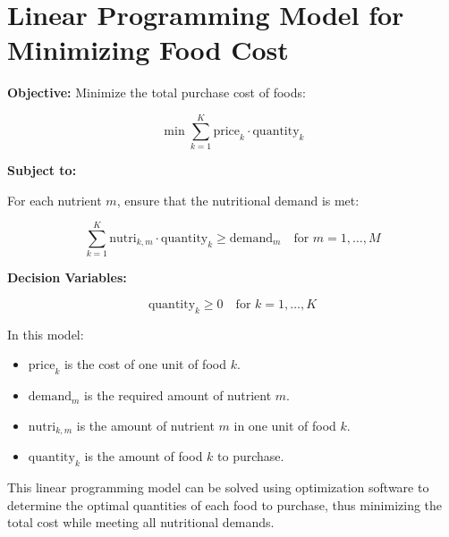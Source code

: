 \documentclass{article}
\begin{document}
\section*{Linear Programming Model for Minimizing Food Cost}

\textbf{Objective:}
Minimize the total purchase cost of foods:

\[
\min \sum_{k=1}^{K} \text{price}_k \cdot \text{quantity}_k
\]

\textbf{Subject to:}

For each nutrient \( m \), ensure that the nutritional demand is met:

\[
\sum_{k=1}^{K} \text{nutri}_{k, m} \cdot \text{quantity}_k \geq \text{demand}_m \quad \text{for } m = 1, \ldots, M
\]

\textbf{Decision Variables:}

\[
\text{quantity}_k \geq 0 \quad \text{for } k = 1, \ldots, K
\]

In this model:
\begin{itemize}
    \item \(\text{price}_k\) is the cost of one unit of food \( k \).
    \item \(\text{demand}_m\) is the required amount of nutrient \( m \).
    \item \(\text{nutri}_{k, m}\) is the amount of nutrient \( m \) in one unit of food \( k \).
    \item \(\text{quantity}_k\) is the amount of food \( k \) to purchase.
\end{itemize}

This linear programming model can be solved using optimization software to determine the optimal quantities of each food to purchase, thus minimizing the total cost while meeting all nutritional demands.
\end{document}
